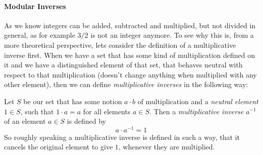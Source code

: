 \paragraph{Modular Inverses} 
As we know integers can be added, subtracted and multiplied, but not divided in general, as for example $3/2$ is not an integer anymore. To see why this is, from a more theoretical perspective, lets consider the definition of a multiplicative inverse first. When we have a set that has some kind of multiplication defined on it and we have a distinguished element of that set, that behaves neutral with respect to that multiplication (doesn't change anything when multiplied with any other element), then we can define \textit{multiplicative inverses} in the following way:

Let $S$ be our set that has some notion $a\cdot b$ of multiplication and a \textit{neutral element} $1\in S$, such that $1\cdot a = a$ for all elements $a\in S$. Then a \textit{multiplicative inverse} $a^{-1}$ of an element $a\in S$ is defined by
\begin{equation}
a\cdot a^{-1} = 1
\end{equation}
So roughly speaking a multiplicative inverse is defined in such a way, that it cancels the original element to give $1$, whenever they are multiplied. 

